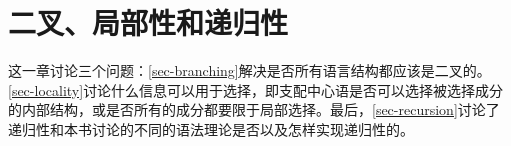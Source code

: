 
\chapter{二叉、局部性和递归性}

这一章讨论三个问题：\ref{sec-branching}解决是否所有语言结构都应该是二叉的。\ref{sec-locality}讨论什么信息可以用于选择，即支配中心语是否可以选择被选择成分的内部结构，或是否所有的成分都要限于局部选择。最后，\ref{sec-recursion}讨论了递归性和本书讨论的不同的语法理论是否以及怎样实现递归性的。




